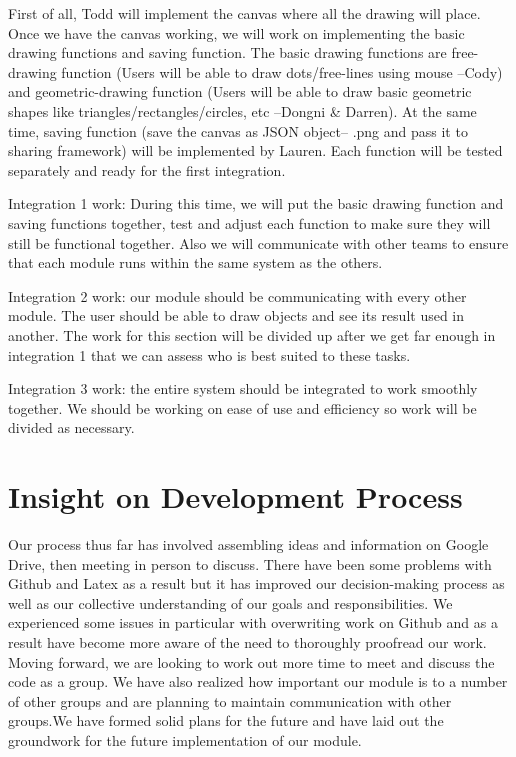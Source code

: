 \documentclass[a4paper, 11pt]{article} %
\begin{document}
First of all, Todd will implement the canvas where all the drawing will place. Once we have the canvas working, we will work on implementing the basic drawing functions and saving function. The basic drawing functions are free-drawing function (Users will be able to draw dots/free-lines using mouse --Cody) and geometric-drawing function (Users will be able to draw basic geometric shapes like triangles/rectangles/circles, etc --Dongni \& Darren). At the same time, saving function (save the canvas as JSON object-- .png and pass it to sharing framework) will be implemented by Lauren. Each function will be tested separately and ready for the first integration.

Integration 1 work:
During this time,  we will put  the basic drawing function and saving functions together, test and adjust each function to make sure they will still be functional together. Also we will communicate with other teams to ensure that each module runs within the same system as the others.

Integration 2 work: our module should be communicating with every other module. The user should be able to draw objects  and see its result used in another. The work for this section will be divided up after we get far enough in integration 1 that we can assess who is best suited to these tasks.

Integration 3 work: the entire system should be integrated to work smoothly together. We should be working on ease of use and efficiency so work will be divided as necessary.


\section*{Insight on Development Process}

Our process thus far has involved assembling ideas and information on Google Drive, then meeting in person to discuss. There have been some problems with Github and Latex as a result but it has improved our decision-making process as well as our collective understanding of our goals and responsibilities. We experienced some issues in particular with overwriting work on Github and as a result have become more aware of the need to thoroughly proofread our work. Moving forward, we are looking to work out more time to meet and discuss the code as a group. We have also realized how important our module is to a number of other groups and are planning to maintain communication with other groups.We have formed solid plans for the future and have laid out the groundwork for the future implementation of our module. 
\end{document}
